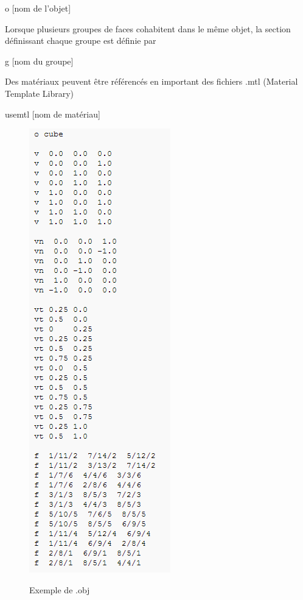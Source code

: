 \documentclass{report}
\begin{document}
o [nom de l'objet]

Lorsque plusieurs groupes de faces cohabitent dans le même objet, la section définissant chaque groupe est définie par

g [nom du groupe]


Des matériaux peuvent être référencés en important des fichiers .mtl (Material Template Library)

usemtl [nom de matériau]

\begin{figure}[!h]
			\centering
			\includegraphics[scale=0.8]{images/exOBJ.png}\\
			\caption{Exemple de .obj}
			\label{Exemple de .obj}
\end{figure}
\end{document}
